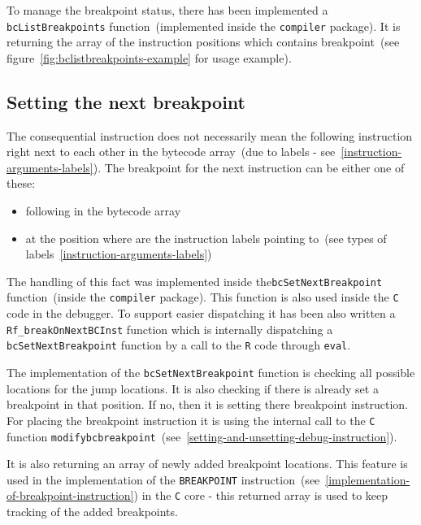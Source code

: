 \documentclass[thesis=M,english]{FITthesis}[2018/10/20]
\newcommand{\code}[1]{\texttt{#1}}
\begin{document}
To manage the breakpoint status, there has been implemented a \code{bcListBreakpoints} function~(implemented inside the \code{compiler} package). It is returning the array of the instruction positions which contains breakpoint~(see figure~\ref{fig:bclistbreakpoints-example} for usage example).


\subsection{Setting the next breakpoint}\label{setting-next-breakpoint}

The consequential instruction does not necessarily mean the following instruction right next to each other in the bytecode array~(due to labels - see~\ref{instruction-arguments-labels}). The breakpoint for the next instruction can be either one of these:

\begin{itemize}
	\item following in the bytecode array
	\item at the position where are the instruction labels pointing to~(see types of labels~\ref{instruction-arguments-labels})
\end{itemize}

The handling of this fact was implemented inside the\code{bcSetNextBreakpoint} function~(inside the \code{compiler} package). This function is also used inside the  \code{C} code in the debugger. To support easier dispatching it has been also written a \code{Rf{\_}breakOnNextBCInst} function which is internally dispatching a \code{bcSetNextBreakpoint} function by a call to the \code{R} code through \code{eval}.

The implementation of the \code{bcSetNextBreakpoint} function is checking all possible locations for the jump locations. It is also checking if there is already set a breakpoint in that position. If no, then it is setting there breakpoint instruction. For placing the breakpoint instruction it is using the internal call to the \code{C} function \code{modifybcbreakpoint}~(see~\ref{setting-and-unsetting-debug-instruction}).

It is also returning an array of newly added breakpoint locations. This feature is used in the implementation of the \code{BREAKPOINT} instruction~(see~\ref{implementation-of-breakpoint-instruction}) in the \code{C} core - this returned array is used to keep tracking of the added breakpoints.
\end{document}
